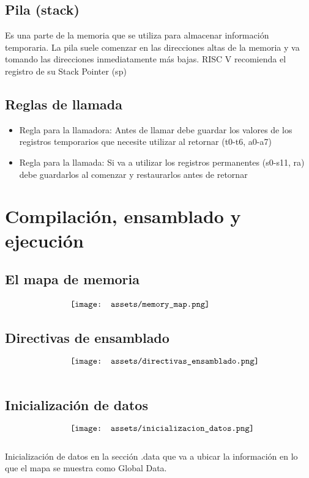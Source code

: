 \documentclass[10pt,a4paper]{article}
\begin{document}
\subsection*{Pila (stack)}
Es una parte de la memoria que se utiliza para almacenar información temporaria. La pila suele comenzar en las direcciones altas de la memoria y va tomando las direcciones inmediatamente más bajas. 
RISC V recomienda el registro de su Stack Pointer (sp)
\subsection*{Reglas de llamada}
\begin{itemize}
    \item Regla para la llamadora: Antes de llamar debe guardar los valores de los registros temporarios que necesite utilizar al retornar (t0-t6, a0-a7)
    \item Regla para la llamada: Si va a utilizar los registros permanentes (s0-s11, ra) debe guardarlos al comenzar y restaurarlos antes de retornar
\end{itemize}
\section*{Compilación, ensamblado y ejecución}
\subsection*{El mapa de memoria}
\[\begin{minipage}[b]{0.6\textwidth}
    \texttt{[image: assets/memory\_map.png]}
    \label{fig:memory_map}
\end{minipage}\]
\subsection*{Directivas de ensamblado}
\[\begin{minipage}[b]{0.6\textwidth}
    \texttt{[image: assets/directivas\_ensamblado.png]}
    \label{fig:directivas_ensamblado}
\end{minipage}\]
\subsection*{Inicialización de datos}
\[\begin{minipage}[b]{0.6\textwidth}
    \texttt{[image: assets/inicializacion\_datos.png]}
    \label{fig:inicializacion_datos}
\end{minipage}\]
Inicialización de datos en la sección .data que va a ubicar la información en lo que el mapa se muestra como Global Data.
\end{document}
